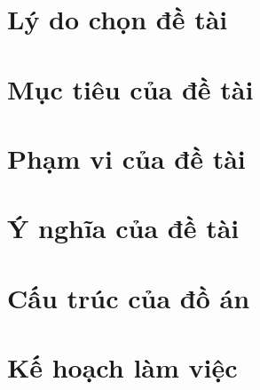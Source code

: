 \section{Lý do chọn đề tài}

\section{Mục tiêu của đề tài}

\section{Phạm vi của đề tài}

\section{Ý nghĩa của đề tài}

\section{Cấu trúc của đồ án}

\section{Kế hoạch làm việc}
